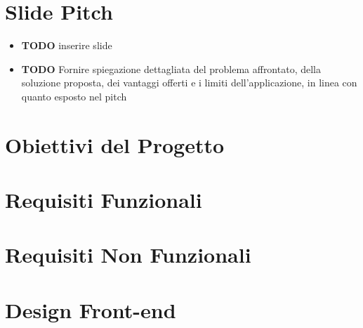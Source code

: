 \documentclass[9pt]{extarticle}
\begin{document}
\customtitle

\tableofcontents
\newpage

\section{Slide Pitch}

\begin{itemize}
	\item \textbf{TODO} inserire slide
	\item \textbf{TODO} Fornire spiegazione dettagliata del problema affrontato, della soluzione proposta, dei vantaggi offerti e i limiti dell’applicazione, in linea con quanto esposto nel pitch
\end{itemize}

\section{Obiettivi del Progetto}
\section{Requisiti Funzionali}
\section{Requisiti Non Funzionali}
\section{Design Front-end}
\end{document}
